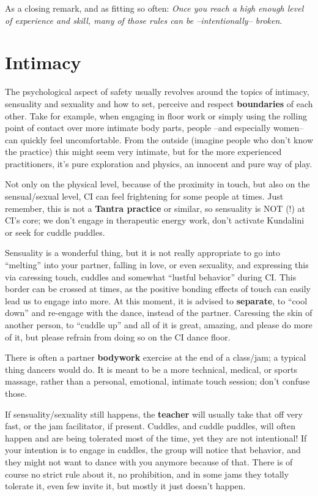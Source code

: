 As a closing remark, and as fitting so often: \textit{Once you reach a high enough level of experience and skill, many of those rules can be --intentionally-- broken}.

\section{Intimacy}\label{sec:intimacy}

The psychological aspect of safety usually revolves around the topics of intimacy, sensuality and sexuality and how to set, perceive and respect \textbf{boundaries} of each other.
Take for example, when engaging in floor work or simply using the rolling point of contact over more intimate body parts, people --and especially women-- can quickly feel uncomfortable.
From the outside (imagine people who don't know the practice) this might seem very intimate, but for the more experienced practitioners, it's pure exploration and physics, an innocent and pure way of play.

Not only on the physical level, because of the proximity in touch, but also on the sensual/sexual level, CI can feel frightening for some people at times.
Just remember, this is not a \textbf{Tantra practice} or similar, so sensuality is NOT (!) at CI's core; we don't engage in therapeutic energy work, don't activate Kundalini or seek for cuddle puddles.

Sensuality is a wonderful thing, but it is not really appropriate to go into ``melting'' into your partner, falling in love, or even sexuality, and expressing this via caressing touch, cuddles and somewhat ``lustful behavior'' during CI\@.
This border can be crossed at times, as the positive bonding effects of touch can easily lead us to engage into more.
At this moment, it is advised to \textbf{separate}, to ``cool down'' and re-engage with the dance, instead of the partner.
Caressing the skin of another person, to ``cuddle up'' and all of it is great, amazing, and please do more of it, but please refrain from doing so on the CI dance floor.

There is often a partner \textbf{bodywork} exercise at the end of a class/jam; a typical thing dancers would do.
It is meant to be a more technical, medical, or sports massage, rather than a personal, emotional, intimate touch session; don't confuse those.

If sensuality/sexuality still happens, the \textbf{teacher} will usually take that off very fast, or the jam facilitator, if present.
Cuddles, and cuddle puddles, will often happen and are being tolerated most of the time, yet they are not intentional!
If your intention is to engage in cuddles, the group will notice that behavior, and they might not want to dance with you anymore because of that.
There is of course no strict rule about it, no prohibition, and in some jams they totally tolerate it, even few invite it, but mostly it just doesn't happen.

